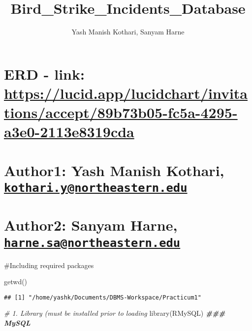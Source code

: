 \documentclass[
]{article}
\title{Bird\_Strike\_Incidents\_Database}
\author{Yash Manish Kothari, Sanyam Harne}
\date{}
\newenvironment{Shaded}{\begin{snugshade}}{\end{snugshade}}
\newcommand{\CommentTok}[1]{\textcolor[rgb]{0.56,0.35,0.01}{\textit{#1}}}
\newcommand{\DocumentationTok}[1]{\textcolor[rgb]{0.56,0.35,0.01}{\textbf{\textit{#1}}}}
\newcommand{\FunctionTok}[1]{\textcolor[rgb]{0.00,0.00,0.00}{#1}}
\newcommand{\NormalTok}[1]{#1}
\begin{document}
\maketitle

\hypertarget{erd---link-httpslucid.applucidchartinvitationsaccept89b73b05-fc5a-4295-a3e0-2113e8319cda}{%
\section{\texorpdfstring{ERD - link:
\url{https://lucid.app/lucidchart/invitations/accept/89b73b05-fc5a-4295-a3e0-2113e8319cda}}{ERD - link: https://lucid.app/lucidchart/invitations/accept/89b73b05-fc5a-4295-a3e0-2113e8319cda}}\label{erd---link-httpslucid.applucidchartinvitationsaccept89b73b05-fc5a-4295-a3e0-2113e8319cda}}

\hypertarget{author1-yash-manish-kothari-kothari.ynortheastern.edu}{%
\section{\texorpdfstring{Author1: Yash Manish Kothari,
\href{mailto:kothari.y@northeastern.edu}{\nolinkurl{kothari.y@northeastern.edu}}}{Author1: Yash Manish Kothari, kothari.y@northeastern.edu}}\label{author1-yash-manish-kothari-kothari.ynortheastern.edu}}

\hypertarget{author2-sanyam-harne-harne.sanortheastern.edu}{%
\section{\texorpdfstring{Author2: Sanyam Harne,
\href{mailto:harne.sa@northeastern.edu}{\nolinkurl{harne.sa@northeastern.edu}}}{Author2: Sanyam Harne, harne.sa@northeastern.edu}}\label{author2-sanyam-harne-harne.sanortheastern.edu}}

\#Including required packages

\begin{Shaded}
\begin{Highlighting}[]
\FunctionTok{getwd}\NormalTok{()}
\end{Highlighting}
\end{Shaded}

\begin{verbatim}
## [1] "/home/yashk/Documents/DBMS-Workspace/Practicum1"
\end{verbatim}

\begin{Shaded}
\begin{Highlighting}[]
\CommentTok{\# 1. Library (must be installed prior to loading}
\FunctionTok{library}\NormalTok{(RMySQL)     }\DocumentationTok{\#\#\# MySQL}
\end{Highlighting}
\end{Shaded}
\end{document}
